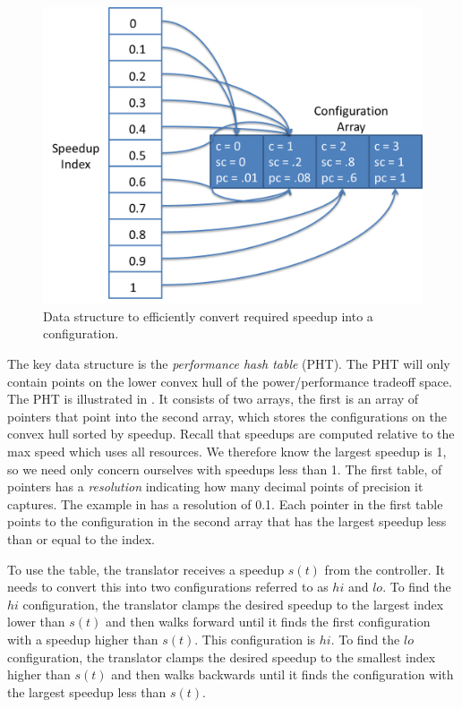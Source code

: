 \begin{figure}
\includegraphics[width=\columnwidth]{figures/SpeedupHashTable.png}
\caption{Data structure to efficiently convert required speedup into a
  configuration.}
  \label{fig:pht}
\end{figure}

The key data structure is the \emph{performance hash table} (PHT).
The PHT will only contain points on the lower convex hull of the
power/performance tradeoff space.  The PHT is illustrated in
.  It consists of two arrays, the first is an array of
pointers that point into the second array, which stores the
configurations on the convex hull sorted by speedup.  Recall that
speedups are computed relative to the max speed which uses all
resources.  We therefore know the largest speedup is 1, so we need
only concern ourselves with speedups less than 1.  The first table, of
pointers has a \emph{resolution} indicating how many decimal points of
precision it captures.  The example in  has a resolution
of 0.1.  Each pointer in the first table points to the configuration
in the second array that has the largest speedup less than or equal to
the index.

To use the table, the translator receives a speedup $s(t)$ from the
controller.  It needs to convert this into two configurations referred
to as $hi$ and $lo$.  To find the $hi$ configuration, the translator
clamps the desired speedup to the largest index lower than $s(t)$ and
then walks forward until it finds the first configuration with a
speedup higher than $s(t)$.  This configuration is $hi$.  To find the
$lo$ configuration, the translator clamps the desired speedup to the
smallest index higher than $s(t)$ and then walks backwards until it
finds the configuration with the largest speedup less than $s(t)$.

